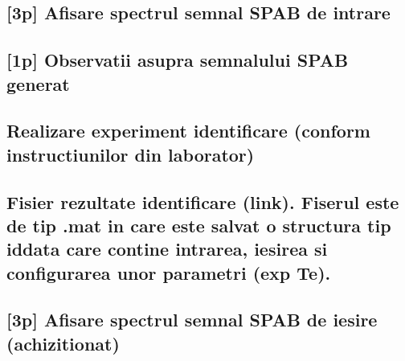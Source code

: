 \documentclass[12pt,english]{article}
\begin{document}
\subsection { [3p] Afisare spectrul semnal SPAB de intrare }
\begin{center}
\end{center}

\subsection { [1p] Observatii asupra semnalului SPAB generat }
\subsection { Realizare experiment identificare (conform instructiunilor din laborator) }
\subsection { Fisier rezultate identificare (link). Fiserul este de tip .mat in care este salvat o structura tip iddata care contine intrarea, iesirea si configurarea unor parametri (exp Te). }
\subsection { [3p] Afisare spectrul semnal SPAB de iesire (achizitionat) }
\begin{center}
\end{center}
\end{document}
